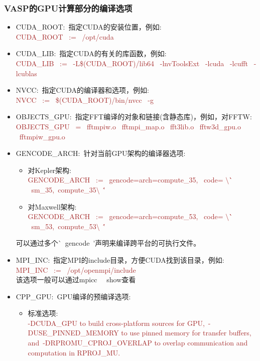 \subsubsection{\rm{VASP的GPU计算部分的编译选项}}
\begin{itemize}
	\item \textrm{CUDA\_ROOT}:~指定\textrm{CUDA}的安装位置，例如:\\
\textcolor{brown}{\textrm{CUDA\_ROOT~ :=~ /opt/cuda }}
	\item \textrm{CUDA\_LIB}:~指定\textrm{CUDA}的有关的库函数，例如:\\
\textcolor{brown}{\textrm{CUDA\_LIB~ :=~ -L\$(CUDA\_ROOT)/lib64 ~-lnvToolsExt ~-lcuda ~-lcufft ~-lcublas}}
	\item \textrm{NVCC}:~指定\textrm{CUDA}的编译器和选项，例如:\\
		\textcolor{brown}{\textrm{NVCC~ :=~ \$(CUDA\_ROOT)/bin/nvcc ~-g }}
	\item \textrm{OBJECTS\_GPU}:~指定\textrm{FFT}编译的对象和链接(含静态库)，例如，对\textrm{FFTW}:\\
\textcolor{brown}{\textrm{OBJECTS\_GPU~ =~ fftmpiw.o ~fftmpi\_map.o ~fft3lib.o ~fftw3d\_gpu.o ~fftmpiw\_gpu.o}}
	\item \textrm{GENCODE\_ARCH}:~针对当前\textrm{GPU}架构的编译器选项:~
		\begin{itemize}
			\item 对\textrm{Kepler}架构:\\
\textcolor{brown}{\textrm{GENCODE\_ARCH~ :=~ gencode=arch=compute\_35, ~code= $\setminus$\`\` ~sm\_35,~compute\_35$\setminus$~\'\'}}
			\item 对\textrm{Maxwell}架构:\\
\textcolor{brown}{\textrm{GENCODE\_ARCH~ :=~ gencode=arch=compute\_53, ~code= $\setminus$\`\` ~sm\_53,~compute\_53$\setminus$~\'\'}}
\end{itemize}
可以通过多个\textrm{\`~gencode~\'}声明来编译跨平台的可执行文件。
	\item \textrm{MPI\_INC}:~指定\textrm{MPI}的\textrm{include}目录，方便\textrm{CUDA}找到该目录，例如:\\
\textcolor{brown}{\textrm{MPI\_INC~ :=~ /opt/openmpi/include}}\\
该选项一般可以通过\textrm{mpicc ~~\-\-show}查看
	\item \textrm{CPP\_GPU}:~\textrm{GPU}编译的预编译选项:
		\begin{itemize}
			\item 标准选项:\\
				\textcolor{brown}{\textrm{-DCUDA\_GPU to build cross-platform sources for GPU,~-DUSE\_PINNED\_MEMORY to use pinned memory for transfer buffers, and~-DRPROMU\_CPROJ\_OVERLAP to overlap communication and computation in RPROJ\_MU.}}

\end{itemize}
\end{itemize}
